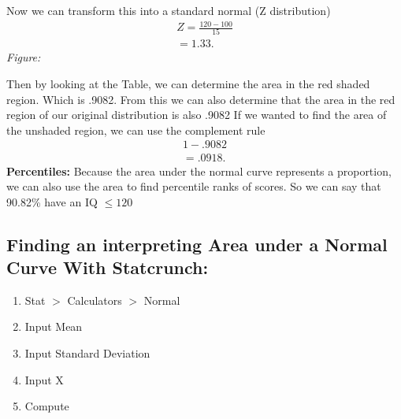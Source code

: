 \documentclass{report}
\begin{document}
    \bigbreak \noindent 
        Now we can transform this into a standard normal (Z distribution)
        \begin{align*}
            Z = \frac{120-100}{15} \\
            = 1.33
        .\end{align*}
        \bigbreak \noindent 
        \textit{Figure:}
        \bigbreak \noindent 
    \bigbreak \noindent 
    Then by looking at the Table, we can determine the area in the red shaded region. Which is .9082. From this we can also determine that the area in the red region of our original distribution is also .9082
    \bigbreak \noindent 
    If we wanted to find the area of the unshaded region, we can use the complement rule
    \begin{align*}
      1- .9082 \\
      = .0918
    .\end{align*}
    \bigbreak \noindent 
    \textbf{Percentiles:}
    \bigbreak \noindent 
    Because the area under the normal curve represents a proportion, we can also use the area to find percentile ranks of scores. 
    \bigbreak \noindent 
    So we can say that 90.82\% have an IQ $ \leq 120$

  \bigbreak \noindent \bigbreak \noindent 
  \subsection*{Finding an interpreting Area under a Normal Curve With Statcrunch:}
      \bigbreak \noindent \bigbreak \noindent 
    \begin{enumerate}
        \item Stat $> $ Calculators $> $ Normal 
        \item Input Mean
        \item Input Standard Deviation
        \item Input X
        \item Compute
    \end{enumerate}
\end{document}
